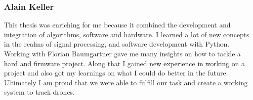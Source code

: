 \subsubsection{Alain Keller}
This thesis was enriching for me because it combined
the development and integration of algorithms, software and hardware.
I learned a lot of new concepts in the realms of signal processing,
and software development with Python.
Working with Florian Baumgartner gave me many insights
on how to tackle a hard and firmware project.
Along that I gained new experience in working
on a project and also got my learnings on what I could do
better in the future.
Ultimately I am proud that we were able to fulfill our task and
create a working system to track drones.